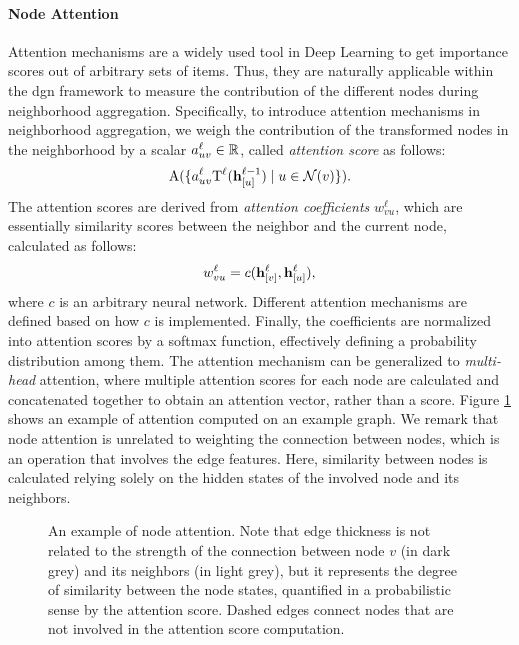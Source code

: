 \paragraph{Node Attention}
Attention mechanisms \cite{?} are a widely used tool in Deep Learning to get importance scores out of arbitrary sets of items. Thus, they are naturally applicable within the \gls{dgn} framework to measure the contribution of the different nodes during neighborhood aggregation. Specifically, to introduce attention mechanisms in neighborhood aggregation, we weigh the contribution of the transformed nodes in the neighborhood by a scalar $a^{\ell}_{uv} \in \mathbb{R}$, called \emph{attention score} as follows:
$$\Fun{A}(\Set{a^{\ell}_{uv}\Fun{T}^{\ell}(\Elem{h}{u}^{\ell-1}) \mid u \in \mathcal{N}(v)}).$$
The attention scores are derived from \emph{attention coefficients} $w_{vu}^{\ell}$, which are essentially similarity scores between the neighbor and the current node, calculated as follows:
$$w_{vu}^{\ell} = c(\Elem{h}{v}^{\ell}, \Elem{h}{u}^{\ell}),$$
where $c$ is an arbitrary neural network. Different attention mechanisms are defined based on how $c$ is implemented. Finally, the coefficients are normalized into attention scores by a softmax function, effectively defining a probability distribution among them. The attention mechanism can be generalized to \emph{multi-head} attention, where multiple attention scores for each node are calculated and concatenated together to obtain an attention vector, rather than a score. Figure \ref{fig:attention} shows an example of attention computed on an example graph. We remark that node attention is unrelated to weighting the connection between nodes, which is an operation that involves the edge features. Here, similarity between nodes is calculated relying solely on the hidden states of the involved node and its neighbors.

\begin{figure}[h!]
    \centering
    \resizebox{.35\textwidth}{!}{}
    \caption{An example of node attention. Note that edge thickness is not related to the strength of the connection between node $v$ (in dark grey) and its neighbors (in light grey), but it represents the degree of similarity between the node states, quantified in a probabilistic sense by the attention score. Dashed edges connect nodes that are not involved in the attention score computation.}
    \label{fig:attention}
\end{figure}

